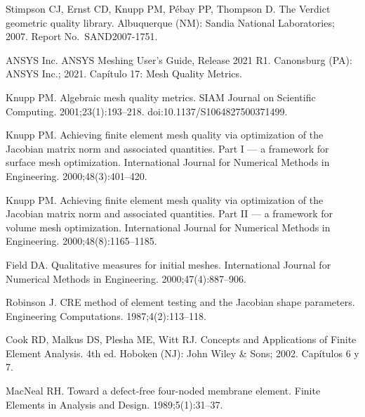 \documentclass[11pt,a4paper]{article}
\begin{document}
\renewcommand{\arraystretch}{1.05}
\begin{enumerate}[label={[\arabic*]},leftmargin=24pt,itemsep=2pt]

\item\label{Stimpson2007} Stimpson CJ, Ernst CD, Knupp PM, P\'ebay PP, Thompson D. The Verdict
geometric quality library. Albuquerque (NM): Sandia National Laboratories; 2007. Report No.\
SAND2007-1751.

\item\label{ANSYS2021} ANSYS Inc. ANSYS Meshing User's Guide, Release 2021 R1. Canonsburg (PA):
ANSYS Inc.; 2021. Cap\'itulo 17: Mesh Quality Metrics.

\item\label{Knupp2001} Knupp PM. Algebraic mesh quality metrics. SIAM Journal on Scientific
Computing. 2001;23(1):193--218. doi:10.1137/S1064827500371499.

\item\label{Knupp2000a} Knupp PM. Achieving finite element mesh quality via optimization of the
Jacobian matrix norm and associated quantities. Part I --- a framework for surface mesh
optimization. International Journal for Numerical Methods in Engineering.
2000;48(3):401--420.

\item\label{Knupp2000b} Knupp PM. Achieving finite element mesh quality via optimization of the
Jacobian matrix norm and associated quantities. Part II --- a framework for volume mesh
optimization. International Journal for Numerical Methods in Engineering.
2000;48(8):1165--1185.

\item\label{Field2000} Field DA. Qualitative measures for initial meshes. International Journal
for Numerical Methods in Engineering. 2000;47(4):887--906.

\item\label{Robinson1987} Robinson J. CRE method of element testing and the Jacobian shape
parameters. Engineering Computations. 1987;4(2):113--118.

\item\label{Cook2002} Cook RD, Malkus DS, Plesha ME, Witt RJ. Concepts and Applications of Finite
Element Analysis. 4th ed. Hoboken (NJ): John Wiley \& Sons; 2002. Cap\'itulos 6 y 7.

\item\label{MacNeal1989} MacNeal RH. Toward a defect-free four-noded membrane element.
Finite Elements in Analysis and Design. 1989;5(1):31--37.


\end{enumerate}
\end{document}
